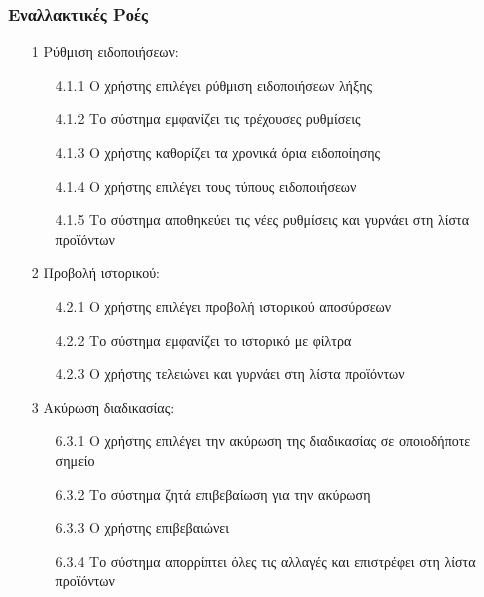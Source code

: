 \documentclass[12pt,a4paper,twoside]{book}
\begin{document}
\subsubsection{Εναλλακτικές Ροές}
\begin{enumerate}
  \item[1 ] Ρύθμιση ειδοποιήσεων:
        \begin{enumerate}
          \item[4.1.1 ] Ο χρήστης επιλέγει ρύθμιση ειδοποιήσεων λήξης
          \item[4.1.2 ] Το σύστημα εμφανίζει τις τρέχουσες ρυθμίσεις
          \item[4.1.3 ] Ο χρήστης καθορίζει τα χρονικά όρια ειδοποίησης
          \item[4.1.4 ] Ο χρήστης επιλέγει τους τύπους ειδοποιήσεων
          \item[4.1.5 ] Το σύστημα αποθηκεύει τις νέες ρυθμίσεις και γυρνάει στη λίστα προϊόντων
        \end{enumerate}
  \item[2 ] Προβολή ιστορικού:
        \begin{enumerate}
          \item[4.2.1 ] Ο χρήστης επιλέγει προβολή ιστορικού αποσύρσεων
          \item[4.2.2 ] Το σύστημα εμφανίζει το ιστορικό με φίλτρα
          \item[4.2.3 ] Ο χρήστης τελειώνει και γυρνάει στη λίστα προϊόντων
        \end{enumerate}
  \item[3 ] Ακύρωση διαδικασίας:
        \begin{enumerate}
          \item[6.3.1 ] Ο χρήστης επιλέγει την ακύρωση της διαδικασίας σε οποιοδήποτε σημείο
          \item[6.3.2 ] Το σύστημα ζητά επιβεβαίωση για την ακύρωση
          \item[6.3.3 ] Ο χρήστης επιβεβαιώνει
          \item[6.3.4 ] Το σύστημα απορρίπτει όλες τις αλλαγές και επιστρέφει στη λίστα προϊόντων
        \end{enumerate}
\end{enumerate}
\end{document}

